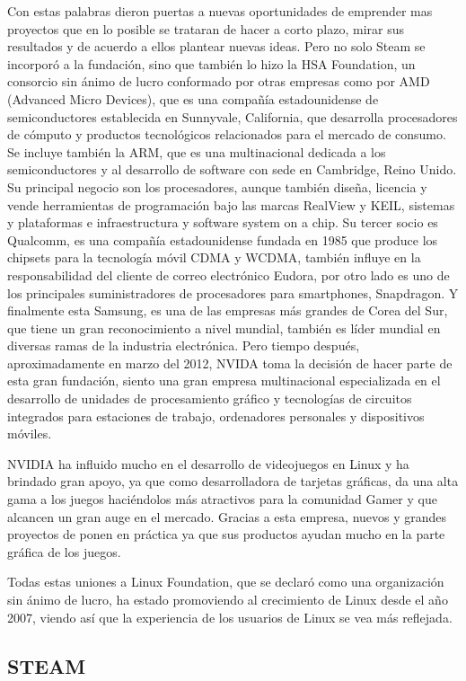 Con estas palabras dieron puertas a nuevas oportunidades de
emprender mas proyectos que en lo posible se trataran de hacer
a corto plazo, mirar sus resultados y de acuerdo a ellos plantear
nuevas ideas. Pero no solo Steam se incorporó a la fundación,
sino que también lo hizo la HSA Foundation, un consorcio sin
ánimo de lucro conformado por otras empresas como por AMD
(Advanced Micro Devices), que es una compañía estadounidense
de semiconductores establecida en Sunnyvale, California, que
desarrolla procesadores de cómputo y productos tecnológicos
relacionados para el mercado de consumo. Se incluye también la
ARM, que es una multinacional dedicada a los semiconductores
y al desarrollo de software con sede en Cambridge, Reino Unido.
Su principal negocio son los procesadores, aunque también
diseña, licencia y vende herramientas de programación bajo las
marcas RealView y KEIL, sistemas y plataformas e
infraestructura y software system on a chip. Su tercer socio es
Qualcomm, es una compañía estadounidense fundada en 1985
que produce los chipsets para la tecnología móvil CDMA y WCDMA,
también influye en la responsabilidad del cliente de
correo electrónico Eudora, por otro lado es uno de los
principales suministradores de procesadores para smartphones,
Snapdragon. Y finalmente esta Samsung, es una de las empresas
más grandes de Corea del Sur, que tiene un gran reconocimiento
a nivel mundial, también es líder mundial en diversas ramas de
la industria electrónica. Pero tiempo después, aproximadamente
en marzo del 2012, NVIDA toma la decisión de hacer parte de
esta gran fundación, siento una gran empresa multinacional
especializada en el desarrollo de unidades de procesamiento
gráfico y tecnologías de circuitos integrados para estaciones de
trabajo, ordenadores personales y dispositivos móviles.

NVIDIA ha influido mucho en el desarrollo de videojuegos en
Linux y ha brindado gran apoyo, ya que como desarrolladora de
tarjetas gráficas, da una alta gama a los juegos haciéndolos más
atractivos para la comunidad Gamer y que alcancen un gran
auge en el mercado. Gracias a esta empresa, nuevos y grandes
proyectos de ponen en práctica ya que sus productos ayudan
mucho en la parte gráfica de los juegos.

Todas estas uniones a Linux Foundation, que se declaró como
una organización sin ánimo de lucro, ha estado promoviendo al
crecimiento de Linux desde el año 2007, viendo así que la
experiencia de los usuarios de Linux se vea más reflejada.

\subsection*{STEAM}

